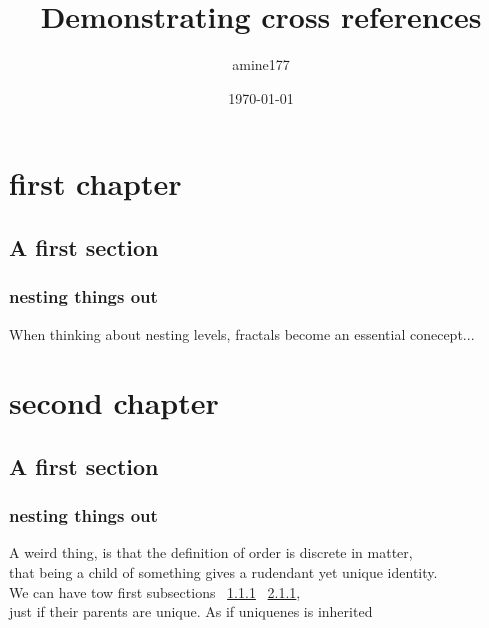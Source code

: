 \documentclass{report}
\begin{document}
\title{Demonstrating cross references}
\author{amine177}
\date{\today}
\maketitle
\tableofcontents
\chapter{first chapter}
\section{A first section}
\subsection{nesting things out}
\label{sec:ss1}
When thinking about nesting levels, fractals become an essential conecept...
\chapter{second chapter}
\section{A first section}
\subsection{nesting things out}
\label{sec:ss2}
A weird thing, is that the definition of order is discrete in matter, \\
that being a child of something gives a rudendant yet unique identity.\\
We can have tow first subsections ~\ref{sec:ss1} ~\ref{sec:ss2}, \\
just if their parents are unique. As if uniquenes is inherited
\end{document}
